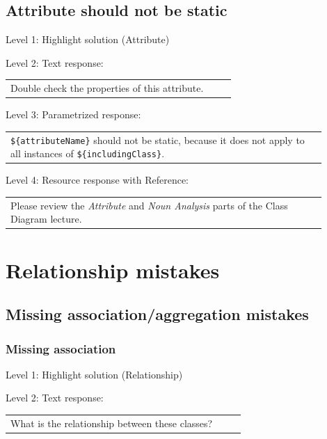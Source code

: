 \subsection{Attribute should not be static}

\noindent Level 1: Highlight solution (Attribute) \medskip

\noindent Level 2: Text response: \medskip

\begin{tabular}{|p{0.9\linewidth}}
Double check the properties of this attribute.
\end{tabular} \medskip

\noindent Level 3: Parametrized response: \medskip

\begin{tabular}{|p{0.9\linewidth}}
\verb|${attributeName}| should not be static, because it does not apply to all instances of \verb|${includingClass}|.
\end{tabular} \medskip

\noindent Level 4: Resource response with Reference: \medskip

\begin{tabular}{|p{0.9\linewidth}}
Please review the \textit{Attribute} and \textit{Noun Analysis} parts of the Class Diagram lecture.
\end{tabular} \medskip



\section{Relationship mistakes}

\subsection{Missing association/aggregation mistakes}

\subsubsection{Missing association}

\noindent Level 1: Highlight solution (Relationship) \medskip

\noindent Level 2: Text response: \medskip

\begin{tabular}{|p{0.9\linewidth}}
What is the relationship between these classes?
\end{tabular} \medskip

